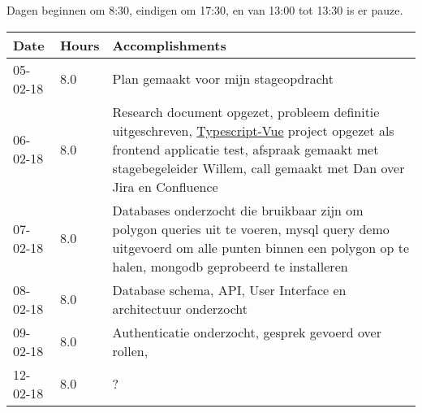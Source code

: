 Dagen beginnen om 8:30, eindigen om 17:30, en van 13:00 tot 13:30 is er pauze.
\begin{center}
    \begin{tabular}{ | l | l | p{9cm} |}
    \hline
    Date & Hours & Accomplishments \\ \hline
    \hline

    05-02-18 & 8.0 & Plan gemaakt voor mijn stageopdracht \\ \hline
    06-02-18 & 8.0 & Research document opgezet, probleem definitie uitgeschreven, \href{https://github.com/Menziess/Typescript-Vue-Template}{Typescript-Vue} project opgezet als frontend applicatie test, afspraak gemaakt met stagebegeleider Willem, call gemaakt met Dan over Jira en Confluence \\ \hline
    07-02-18 & 8.0 & Databases onderzocht die bruikbaar zijn om polygon queries uit te voeren, mysql query demo uitgevoerd om alle punten binnen een polygon op te halen, mongodb geprobeerd te installeren \\ \hline
    08-02-18 & 8.0 & Database schema, API, User Interface en architectuur onderzocht \\ \hline
    09-02-18 & 8.0 & Authenticatie onderzocht, gesprek gevoerd over rollen,  \\ \hline
    \hline

    12-02-18 & 8.0 & ?\\ \hline


    \hline
    \end{tabular}
\end{center}